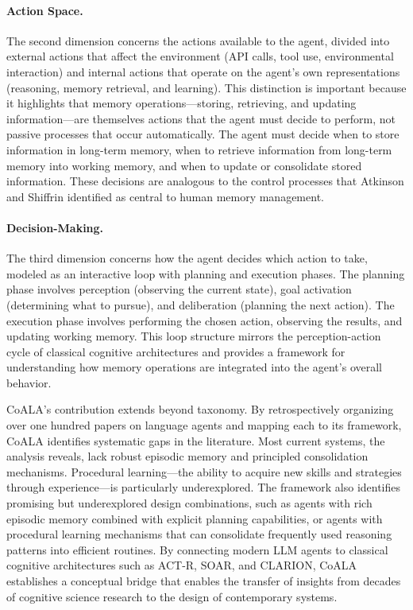 \paragraph{Action Space.} The second dimension concerns the actions available to the agent, divided into external actions that affect the environment (API calls, tool use, environmental interaction) and internal actions that operate on the agent's own representations (reasoning, memory retrieval, and learning). This distinction is important because it highlights that memory operations---storing, retrieving, and updating information---are themselves actions that the agent must decide to perform, not passive processes that occur automatically. The agent must decide when to store information in long-term memory, when to retrieve information from long-term memory into working memory, and when to update or consolidate stored information. These decisions are analogous to the control processes that Atkinson and Shiffrin identified as central to human memory management.

\paragraph{Decision-Making.} The third dimension concerns how the agent decides which action to take, modeled as an interactive loop with planning and execution phases. The planning phase involves perception (observing the current state), goal activation (determining what to pursue), and deliberation (planning the next action). The execution phase involves performing the chosen action, observing the results, and updating working memory. This loop structure mirrors the perception-action cycle of classical cognitive architectures and provides a framework for understanding how memory operations are integrated into the agent's overall behavior.

CoALA's contribution extends beyond taxonomy. By retrospectively organizing over one hundred papers on language agents and mapping each to its framework, CoALA identifies systematic gaps in the literature. Most current systems, the analysis reveals, lack robust episodic memory and principled consolidation mechanisms. Procedural learning---the ability to acquire new skills and strategies through experience---is particularly underexplored. The framework also identifies promising but underexplored design combinations, such as agents with rich episodic memory combined with explicit planning capabilities, or agents with procedural learning mechanisms that can consolidate frequently used reasoning patterns into efficient routines. By connecting modern LLM agents to classical cognitive architectures such as ACT-R, SOAR, and CLARION, CoALA establishes a conceptual bridge that enables the transfer of insights from decades of cognitive science research to the design of contemporary systems.

